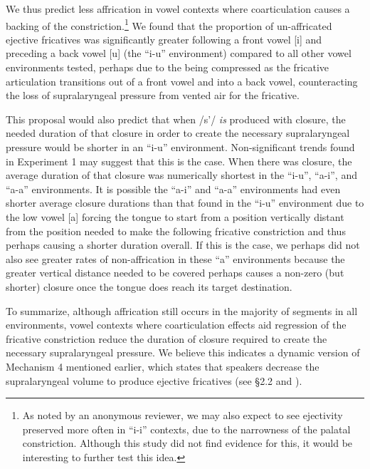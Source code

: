 \documentclass[output=paper
,newtxmath
,modfonts
,nonflat]{langsci/langscibook}
\begin{document}
We thus predict less affrication in vowel contexts where coarticulation causes a backing of the constriction.\footnote{As noted by an anonymous reviewer, we may also expect to see ejectivity preserved more often in “i-i” contexts, due to the narrowness of the palatal constriction. Although this study did not find evidence for this, it would be interesting to further test this idea.} We found that the proportion of un-affricated ejective fricatives was significantly greater following a front vowel [i] and preceding a back vowel [u] (the “i-u” environment) compared to all other vowel environments tested, perhaps due to the  being compressed as the fricative articulation transitions out of a front vowel and into a back vowel, counteracting the loss of supralaryngeal pressure from vented air for the fricative. 

This proposal would also predict that when /s’/ \textit{is} produced with closure, the needed duration of that closure in order to create the necessary supralaryngeal pressure would be shorter in an “i-u” environment. Non-significant trends found in Experiment 1 may suggest that this is the case. When there was closure, the average duration of that closure was numerically shortest in the “i-u”, “a-i”, and “a-a” environments. It is possible the “a-i” and “a-a” environments had even shorter average closure durations than that found in the “i-u” environment due to the low vowel [a] forcing the tongue to start from a position vertically distant from the position needed to make the following fricative constriction and thus perhaps causing a shorter duration overall. If this is the case, we perhaps did not also see greater rates of non-affrication in these “a” environments because the greater vertical distance needed to be covered perhaps causes a non-zero (but shorter) closure once the tongue does reach its target destination.

To summarize, although affrication still occurs in the majority of segments in all environments, vowel contexts where coarticulation effects aid regression of the fricative constriction reduce the duration of closure required to create the necessary supralaryngeal pressure. We believe this indicates a dynamic version of Mechanism 4 mentioned earlier, which states that speakers decrease the supralaryngeal volume to produce ejective fricatives (see §2.2 and \citealt{demolin2002search}).
\end{document}
